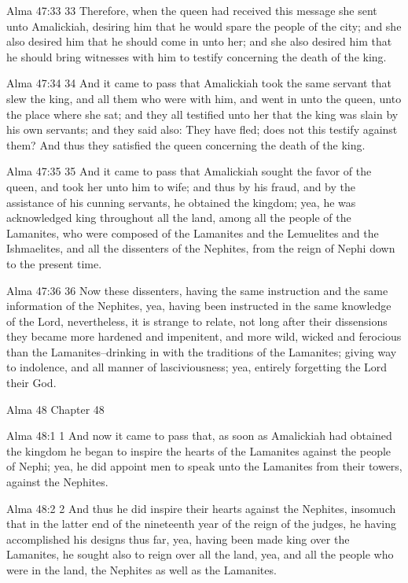 Alma 47:33
 33 Therefore, when the queen had received this message she sent
unto Amalickiah, desiring him that he would spare the people of
the city; and she also desired him that he should come in unto
her; and she also desired him that he should bring witnesses with
him to testify concerning the death of the king.

Alma 47:34
 34 And it came to pass that Amalickiah took the same servant
that slew the king, and all them who were with him, and went in
unto the queen, unto the place where she sat; and they all
testified unto her that the king was slain by his own servants;
and they said also: They have fled; does not this testify against
them?  And thus they satisfied the queen concerning the death of
the king.

Alma 47:35
 35 And it came to pass that Amalickiah sought the favor of the
queen, and took her unto him to wife; and thus by his fraud, and
by the assistance of his cunning servants, he obtained the
kingdom; yea, he was acknowledged king throughout all the land,
among all the people of the Lamanites, who were composed of the
Lamanites and the Lemuelites and the Ishmaelites, and all the
dissenters of the Nephites, from the reign of Nephi down to the
present time.

Alma 47:36
 36 Now these dissenters, having the same instruction and the
same information of the Nephites, yea, having been instructed in
the same knowledge of the Lord, nevertheless, it is strange to
relate, not long after their dissensions they became more
hardened and impenitent, and more wild, wicked and ferocious than
the Lamanites--drinking in with the traditions of the Lamanites;
giving way to indolence, and all manner of lasciviousness; yea,
entirely forgetting the Lord their God.

Alma 48
Chapter 48

Alma 48:1
 1 And now it came to pass that, as soon as Amalickiah had
obtained the kingdom he began to inspire the hearts of the
Lamanites against the people of Nephi; yea, he did appoint men to
speak unto the Lamanites from their towers, against the Nephites.

Alma 48:2
 2 And thus he did inspire their hearts against the Nephites,
insomuch that in the latter end of the nineteenth year of the
reign of the judges, he having accomplished his designs thus far,
yea, having been made king over the Lamanites, he sought also to
reign over all the land, yea, and all the people who were in the
land, the Nephites as well as the Lamanites.

